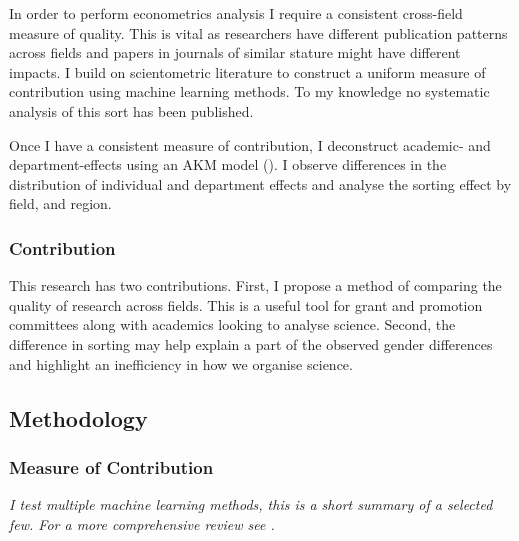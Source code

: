 \documentclass[10pt]{report}
\begin{document}


In order to perform econometrics analysis I require a consistent cross-field measure of quality. This is vital as researchers have different publication patterns across fields and papers in journals of similar stature might have different impacts. I build on scientometric literature to construct a uniform measure of contribution using machine learning methods. To my knowledge no systematic analysis of this sort has been published.

Once I have a consistent measure of contribution, I deconstruct academic- and department-effects using an AKM model (\cite{Abowd1999}). I observe differences in the distribution of individual and department effects and analyse the sorting effect by field, and region.

\subsubsection*{Contribution}

This research has two contributions. First, I propose a method of comparing the quality of research across fields. This is a useful tool for grant and promotion committees along with academics looking to analyse science.
Second, the difference in sorting may help explain a part of the observed gender differences and highlight an inefficiency in how we organise science.


\subsection*{Methodology}
\label{sec:method}


\subsubsection*{Measure of Contribution}
\label{ssec:contrib}

\vspace{5pt}

\textit{I test multiple machine learning methods, this is a short summary of a selected few. For a more comprehensive review see \textcite[Chapter 19]{Kuhn2013}.}
\end{document}
